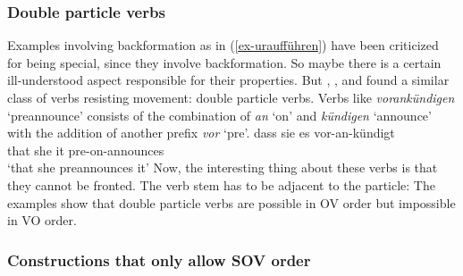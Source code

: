 \subsubsection{Double particle verbs}

Examples involving backformation as in (\ref{ex-uraufführen}) have been criticized for being special, since they involve
backformation. So maybe there is a certain ill-understood aspect responsible for their properties. But
\citet[]{Haider93a},
\citet[]{Vikner2001a}, \citet{Fortmann2007a} and \citet[--60]{Haider2010a} found a similar
class of verbs resisting movement: double particle verbs. Verbs like \emph{vorankündigen} `preannounce'
consists of the combination of \emph{an} `on' and \emph{kündigen} `announce' with the addition of another prefix \emph{vor} `pre'.
\ea 
\label{ex-dass-sie-es-vorankündigt}
\gll dass sie es vor-an-kündigt\\
     that she it pre-on-announces\\
\glt `that she preannounces it'
\z
Now, the interesting thing about these verbs is that they cannot be fronted. The verb stem has to be
adjacent to the particle:
\eal
{}
\zl
The examples show that double particle verbs are possible in OV order but impossible in VO order.


\subsubsection{Constructions that only allow SOV order}

